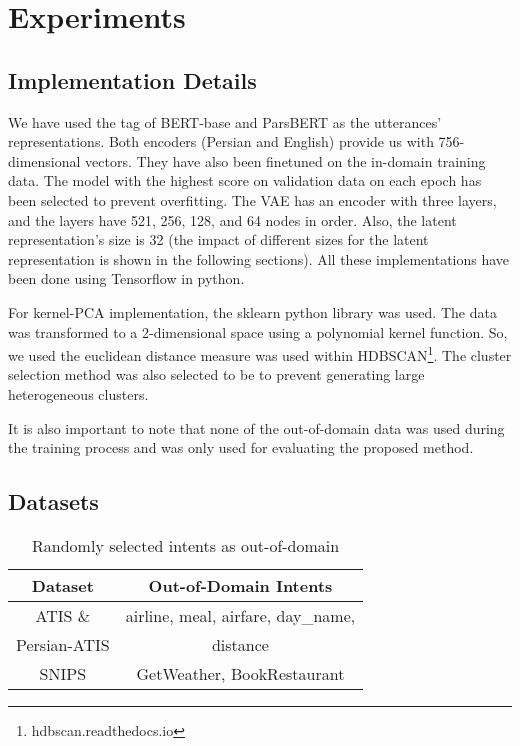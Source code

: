 \documentclass{article}
\begin{document}
\section{Experiments}\label{experiments}

\subsection{Implementation Details}

\noindent We have used the  tag of BERT-base and ParsBERT as the utterances' representations. 
Both encoders (Persian and English) provide us with 756-dimensional vectors. 
They have also been finetuned on the in-domain training data. 
The model with the highest score on validation data on each epoch has been selected to prevent overfitting. 
The VAE has an encoder with three layers, and the layers have 521, 256, 128, and 64 nodes in order. 
Also, the latent representation's size is 32 (the impact of different sizes for the latent representation is shown in the following sections). 
All these implementations have been done using Tensorflow in python.

For kernel-PCA implementation, the sklearn python library was used. 
The data was transformed to a 2-dimensional space using a polynomial kernel function. 
So, we used the euclidean distance measure was used within HDBSCAN\footnote{hdbscan.readthedocs.io}. 
The cluster selection method was also selected to be  to prevent generating large heterogeneous clusters.

It is also important to note that none of the out-of-domain data was used during the training process and was only used for evaluating the proposed method.

\subsection{Datasets}\label{datasets}

\begin{table}[t!]
  \centering
  \caption{Randomly selected intents as out-of-domain}
  \label{tab1}
  \begin{tabular}{cc}
      \toprule
      Dataset  & Out-of-Domain Intents \\ \hline
      \midrule
      ATIS \&     & airline, meal, airfare, day\_name,        \\
      Persian-ATIS & distance \\ \hline
      SNIPS          & GetWeather, BookRestaurant        \\
      \bottomrule
  \end{tabular}
\end{table}
\end{document}
